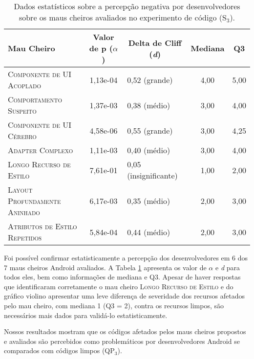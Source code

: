 \begin{table}[!htb]
\centering
\renewcommand*{\arraystretch}{1}
\footnotesize
\caption{Dados estatísticos sobre a percepção negativa por desenvolvedores sobre os maus cheiros avaliados no experimento de código (S$_3$).} 
\begin{tabular}{@{}p{7cm}clcc@{}}
\toprule
\textbf{Mau Cheiro} & \multicolumn{1}{c}{\textbf{Valor de p ($\alpha$)}} & \multicolumn{1}{c}{\textbf{Delta de Cliff (\textit{d})}} & \textbf{Mediana} & \textbf{Q3} \\
\toprule
\textsc{\small Componente de UI Acoplado}       &  1,13e-04  &    0,52 (grande) & 4,00         & 5,00 \\
\textsc{\small Comportamento Suspeito}          &  1,37e-03  &    0,38 (médio)  & 3,00         & 4,00 \\
\textsc{\small Componente de UI Cérebro}        &  4,58e-06  &    0,55 (grande) & 3,00         & 4,25 \\
\textsc{\small Adapter Complexo}                &  1,11e-03  &    0,40 (médio)  & 3,00         & 4,00 \\
\textsc{\small Longo Recurso de Estilo}         &  7,61e-01  &    0,05 (insignificante) & 1,00 & 2,00 \\
\textsc{\small Layout Profundamente Aninhado}   &  6,17e-03  &    0,35 (médio)  & 2,00         & 3,00 \\
\textsc{\small Atributos de Estilo Repetidos}   &  5,84e-04  &    0,44 (médio)  & 2,00         & 3,00 \\
\bottomrule
\end{tabular}
\label{tab:smells-avaliados}
\end{table}


Foi possível confirmar estatisticamente a percepção dos desenvolvedores em 6 dos 7 maus cheiros Android avaliados. A Tabela \ref{tab:smells-avaliados} apresenta os valor de $\alpha$ e \textit{d} para todos eles, bem como informações de mediana e Q3. Apesar de haver respostas que identificaram corretamente o mau cheiro \textsc{\small Longo Recurso de Estilo} e do gráfico violino apresentar uma leve diferença de severidade dos recursos afetados pelo mau cheiro, com mediana 1 (Q3 = 2), contra os recursos limpos, são necessários mais dados para validá-lo estatisticamente. \\

\begin{square}
  \small
  Nossos resultados mostram que os códigos afetados pelos maus cheiros propostos e avaliados são percebidos como problemáticos por desenvolvedores Android se comparados com códigos limpos (QP$_3$).
\end{square}

